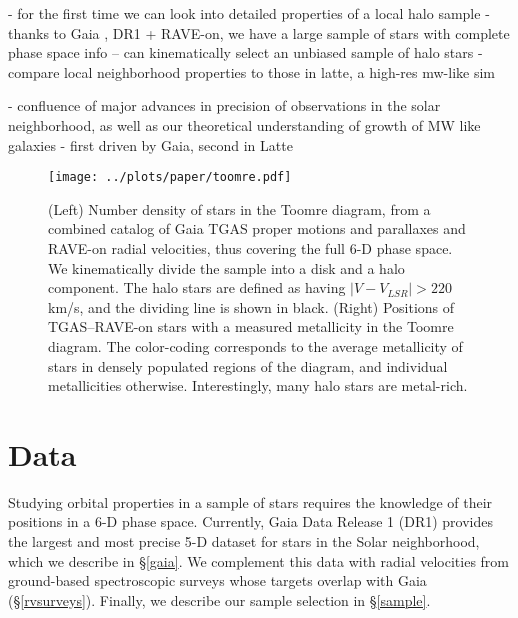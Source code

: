 \documentclass[apj, twocolappendix, numberedappendix, appendixfloats]{emulateapj}
\begin{document}
- for the first time we can look into detailed properties of a local halo sample
- thanks to Gaia \citep{perryman2001}, DR1 + RAVE-on, we have a large sample of stars with complete phase space info -- can kinematically select an unbiased sample of halo stars
- compare local neighborhood properties to those in latte, a high-res mw-like sim

- confluence of major advances in precision of observations in the solar neighborhood, as well as our theoretical understanding of growth of MW like galaxies
- first driven by Gaia, second in Latte


\begin{figure*}
\begin{center}
\texttt{[image: ../plots/paper/toomre.pdf]}
\caption{(Left) Number density of stars in the Toomre diagram, from a combined catalog of Gaia TGAS proper motions and parallaxes and RAVE-on radial velocities, thus covering the full 6-D phase space.
We kinematically divide the sample into a disk and a halo component.
The halo stars are defined as having $|V-V_{LSR}|>220$\,km/s, and the dividing line is shown in black.
(Right) Positions of TGAS--RAVE-on stars with a measured metallicity in the Toomre diagram.
The color-coding corresponds to the average metallicity of stars in densely populated regions of the diagram, and individual metallicities otherwise.
Interestingly, many halo stars are metal-rich.}
\label{fig:toomre}
\end{center}
\end{figure*}


\section{Data}
Studying orbital properties in a sample of stars requires the knowledge of their positions in a 6-D phase space.
Currently, Gaia Data Release 1 (DR1) provides the largest and most precise 5-D dataset for stars in the Solar neighborhood, which we describe in \S\ref{gaia}.
We complement this data with radial velocities from ground-based spectroscopic surveys whose targets overlap with Gaia (\S\ref{rvsurveys}).
Finally, we describe our sample selection in \S\ref{sample}.
\end{document}
